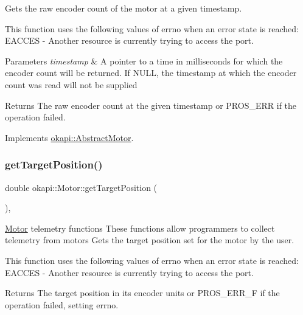 Gets the raw encoder count of the motor at a given timestamp.

This function uses the following values of errno when an error state is reached\+: E\+A\+C\+C\+ES -\/ Another resource is currently trying to access the port.


\begin{DoxyParams}{Parameters}
{\em timestamp} & A pointer to a time in milliseconds for which the encoder count will be returned. If N\+U\+LL, the timestamp at which the encoder count was read will not be supplied\\
\hline
\end{DoxyParams}
\begin{DoxyReturn}{Returns}
The raw encoder count at the given timestamp or P\+R\+O\+S\+\_\+\+E\+RR if the operation failed. 
\end{DoxyReturn}


Implements \mbox{\hyperlink{classokapi_1_1AbstractMotor_aa34fefa954fbff26e3d68e59c4f10964}{okapi\+::\+Abstract\+Motor}}.

\mbox{\label{classokapi_1_1Motor_af575af2b4d4cf5aea6e8aac50ef1cbbd}} 
\subsubsection{\texorpdfstring{getTargetPosition()}{getTargetPosition()}}
{\footnotesize\ttfamily double okapi\+::\+Motor\+::get\+Target\+Position (\begin{DoxyParamCaption}{ }\end{DoxyParamCaption})\hspace{0.3cm}{\ttfamily [override]}, {\ttfamily [virtual]}}

\mbox{\hyperlink{classokapi_1_1Motor}{Motor}} telemetry functions These functions allow programmers to collect telemetry from motors Gets the target position set for the motor by the user.

This function uses the following values of errno when an error state is reached\+: E\+A\+C\+C\+ES -\/ Another resource is currently trying to access the port.

\begin{DoxyReturn}{Returns}
The target position in its encoder units or P\+R\+O\+S\+\_\+\+E\+R\+R\+\_\+F if the operation failed, setting errno. 
\end{DoxyReturn}


